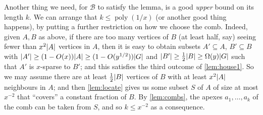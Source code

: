 \documentclass[11pt,reqno,a4paper]{amsart}
\newcommand{\dd}{\textquotedblleft}
\newcommand{\ee}{\textquotedblright}
\newcommand{\mac}{\mathcal}
\newcommand{\poly}{\operatorname{poly}}
\DeclarePairedDelimiter\abs{\lvert}{\rvert}%
\begin{document}
	Another thing we need, for $\mac B$ to satisfy the lemma, is a good {\em upper} bound on its length $k$.
	We can arrange that
	$k\le \poly(1/x)$ (or another good thing happens), by putting a further restriction on how we choose the comb.
	Indeed, given $A,B$ as above, if there are too many vertices of $B$ (at least half, say) seeing fewer than $x^2\abs A$ vertices 
	in $A$, then it is easy to obtain subsets $A'\subseteq A$, $B'\subseteq B$ with $\abs {A'}\ge(1-O(x))\abs A\ge(1-O(y^{1/2}))\abs G$ and $\abs{B'}\ge\frac12\abs B\ge \Omega(y)\abs G$ such that $A'$ is $x$-sparse to $B'$;
	and this satisfies the third outcome of \cref{lem:house1}.
	So we may assume there are at least $\frac12\abs B$ vertices of $B$ with at least $x^2\abs A$ neighbours in $A$;
	and then \cref{lem:locate} gives us some subset $S$ of $A$ of size at most $x^{-2}$ that \dd covers\ee{} a constant fraction of $B$.
	By \cref{lem:combs}, the apexes $a_1,\ldots,a_k$ of the comb can be taken from $S$, and so $k\le x^{-2}$ as a consequence.
	
\end{document}
